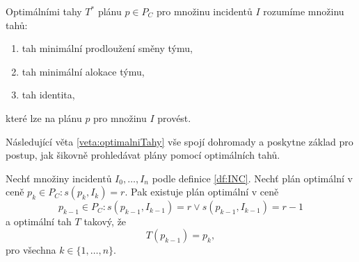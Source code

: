 \begin{definice}\label{df:optimalniTahy}
  Optimálními tahy $T^*$ plánu $p \in P_C$ pro množinu incidentů $I$ rozumíme množinu tahů:
  \begin{enumerate}
  \item
    tah minimální prodloužení směny týmu,
  \item
    tah minimální alokace týmu,
  \item
    tah identita,
  \end{enumerate}
  které lze na plánu $p$ pro množinu $I$ provést.
\end{definice}

Následující věta \ref{veta:optimalniTahy} vše spojí dohromady a poskytne základ pro postup, jak šikovně prohledávat plány pomocí optimálních tahů.
\begin{veta}\label{veta:optimalniTahy}
  Nechť množiny incidentů $I_0, \dots, I_n$ podle definice \ref{df:INC}.
  Nechť plán optimální v ceně $p_k \in P_C \colon s(p_k, I_k) = r$.
  Pak existuje plán optimální v ceně
  \begin{equation*}
    p_{k-1} \in P_C \colon s(p_{k-1}, I_{k-1}) = r \lor s(p_{k-1}, I_{k-1}) = r - 1
  \end{equation*}
  a optimální tah $T$ takový, že
  \begin{equation*}
    T(p_{k-1}) = p_k,
  \end{equation*}
  pro všechna $k \in \{ 1, \dots, n\}$.
\end{veta}
